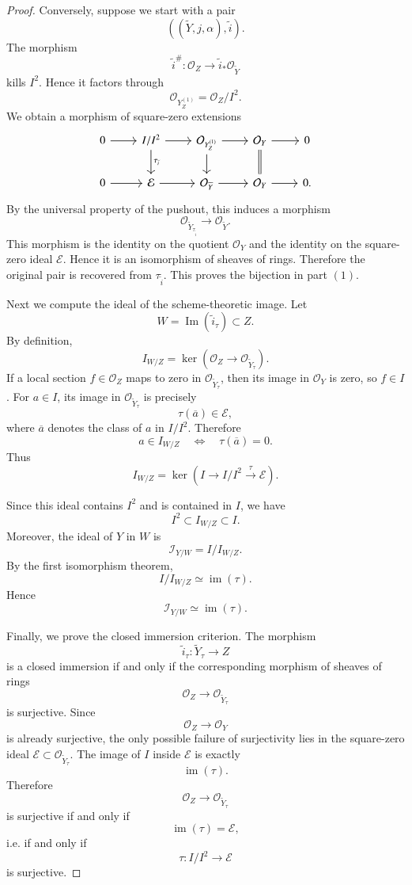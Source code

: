 \documentclass[11pt,twoside]{amsart}
\theoremstyle{plain}
\numberwithin{equation}{section}
\theoremstyle{definition}
\begin{document}
\begin{proof}
Conversely, suppose we start with a pair
\[
    \left((\widetilde Y,j,\alpha),\widetilde i\right).
\]
The morphism
\[
    \widetilde i^\#:\mathcal O_Z\to\widetilde i_*\mathcal O_{\widetilde Y}
\]
kills \(I^2\). Hence it
factors through
\[
    \mathcal O_{Y^{(1)}_Z}=\mathcal O_Z/I^2.
\]
We obtain a morphism of square-zero extensions
\[
\begin{tikzcd}
    0 \arrow[r] &
    I/I^2 \arrow[r] \arrow[d,"\tau_{\widetilde i}"] &
    \mathcal O_{Y^{(1)}_Z} \arrow[r] \arrow[d] &
    \mathcal O_Y \arrow[r] \arrow[d,equal] &
    0
    \\
    0 \arrow[r] &
    \mathcal E \arrow[r] &
    \mathcal O_{\widetilde Y} \arrow[r] &
    \mathcal O_Y \arrow[r] &
    0 .
\end{tikzcd}
\]
By the universal property of the pushout, this induces a morphism
\[
    \mathcal O_{\widetilde Y_{\tau_{\widetilde i}}}
    \longrightarrow
    \mathcal O_{\widetilde Y}.
\]
This morphism is the identity on the quotient \(\mathcal O_Y\) and the identity on the
square-zero ideal \(\mathcal E\). Hence it is an isomorphism of sheaves of rings. Therefore
the original pair is recovered from \(\tau_{\widetilde i}\). This proves the bijection in
part \((1)\).

Next we compute the ideal of the scheme-theoretic image. Let
\[
    W=\operatorname{Im}(\widetilde i_\tau)\subset Z.
\]
By definition,
\[
    I_{W/Z}
    =
    \ker\left(
        \mathcal O_Z\to \mathcal O_{\widetilde Y_\tau}
    \right).
\]
If a local section \(f\in\mathcal O_Z\) maps to zero in \(\mathcal O_{\widetilde Y_\tau}\),
then its image in \(\mathcal O_Y\) is zero, so \(f\in I\). For \(a\in I\), its image in
\(\mathcal O_{\widetilde Y_\tau}\) is precisely
\[
    \tau(\overline a)\in\mathcal E,
\]
where \(\overline a\) denotes the class of \(a\) in \(I/I^2\). Therefore
\[
    a\in I_{W/Z}
    \quad\Longleftrightarrow\quad
    \tau(\overline a)=0.
\]
Thus
\[
    I_{W/Z}
    =
    \ker\left(
        I
        \longrightarrow
        I/I^2
        \xrightarrow{\tau}
        \mathcal E
    \right).
\]

Since this ideal contains \(I^2\) and is contained in \(I\), we have
\[
    I^2\subset I_{W/Z}\subset I.
\]
Moreover, the ideal of \(Y\) in \(W\) is
\[
    \mathcal I_{Y/W}=I/I_{W/Z}.
\]
By the first isomorphism theorem,
\[
    I/I_{W/Z}\simeq\operatorname{im}(\tau).
\]
Hence
\[
    \mathcal I_{Y/W}\simeq \operatorname{im}(\tau).
\]

Finally, we prove the closed immersion criterion. The morphism
\[
    \widetilde i_\tau:\widetilde Y_\tau\to Z
\]
is a closed immersion if and only if the corresponding morphism of sheaves of rings
\[
    \mathcal O_Z\to \mathcal O_{\widetilde Y_\tau}
\]
is surjective. Since
\[
    \mathcal O_Z\to\mathcal O_Y
\]
is already surjective, the only possible failure of surjectivity lies in the square-zero
ideal \(\mathcal E\subset\mathcal O_{\widetilde Y_\tau}\). The image of \(I\) inside
\(\mathcal E\) is exactly
\[
    \operatorname{im}(\tau).
\]
Therefore
\[
    \mathcal O_Z\to \mathcal O_{\widetilde Y_\tau}
\]
is surjective if and only if
\[
    \operatorname{im}(\tau)=\mathcal E,
\]
i.e. if and only if
\[
    \tau:I/I^2\to\mathcal E
\]
is surjective.


\end{proof}
\end{document}
